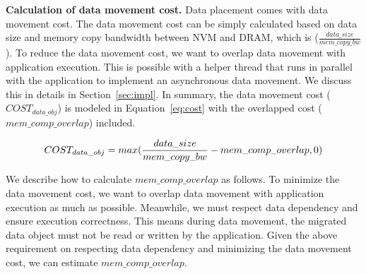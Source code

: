 \textbf{Calculation of data movement cost.}
Data placement comes with data movement cost.
The data movement cost can be simply calculated based on data size 
and memory copy bandwidth between NVM and DRAM, which is ($\frac{data\_size}{mem\_copy\_bw}$). 
To reduce the data movement cost, we want to overlap
data movement with application execution. 
This is possible with a helper thread
that runs in parallel with the application to implement
an asynchronous data movement. We discuss this in details 
in Section~\ref{sec:impl}. 
In summary, the data movement cost ($COST_{data\_obj}$) 
is modeled in Equation~\ref{eq:cost}
with the overlapped cost ($mem\_comp\_overlap$) included.

\begin{comment}
To overlap data movement with the application execution, 
we introduce a helper thread that performs data movement (see Section~\ref{sec:impl} for details).
The helper thread runs in parallel with the main program,
which reduces the data movement cost by $mem\_comp\_overlap$.
We describe how to calculate $mem\_comp\_overlap$ as follows.
\end{comment}

\begin{equation}
\label{eq:cost}
\scriptsize
COST_{data\_obj} = max(\frac{data\_size}{mem\_copy\_bw} - mem\_comp\_overlap, 0)
\end{equation}

We describe how to calculate $mem\_comp\_overlap$ as follows.
To minimize the data movement cost, we want to overlap data movement
with application execution as much as possible.
Meanwhile, we must respect data dependency and ensure execution correctness. This means during data movement, the migrated data object must not be read or written by the application.
Given the above requirement on respecting data dependency and minimizing the data movement cost, we can estimate $mem\_comp\_overlap$. 

\begin{comment}
\begin{figure*}
\begin{minipage}[t]{.33\textwidth}
  \centering
  \texttt{[image: figures/trigger\_migration.pdf]}
  \caption{An example for determining where to trigger data migration in Step 2. The blue circle is the point to trigger the migration of the data object $a$ for the phase $i$.}
\label{fig:trigger_migration}
\end{minipage}%

\begin{minipage}[t]{.33\textwidth}
  \centering
  \texttt{[image: figures/trigger\_migration.pdf]}
  \caption{Another figure}
  \label{fig:local_vs_global}
\end{minipage}
\end{figure*}
\end{comment}

